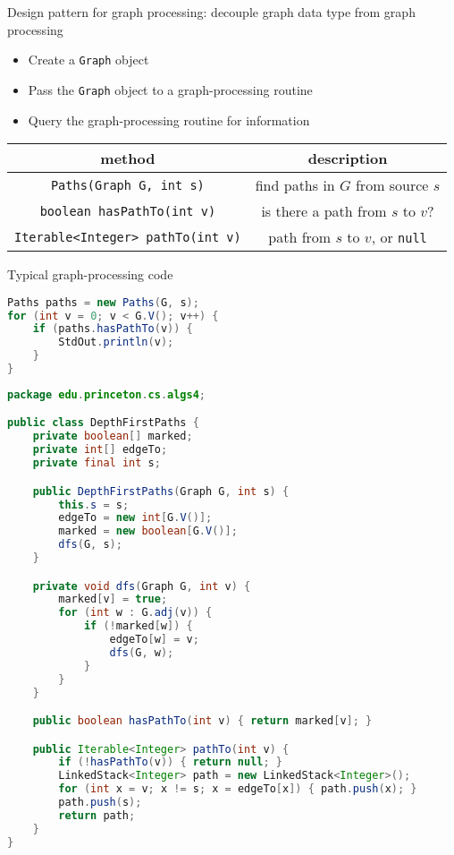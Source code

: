 \documentclass[8pt,a4paper,compress]{beamer}
\begin{document}
\begin{frame}[fragile]
\pause

Design pattern for graph processing: decouple graph data type from graph processing
\begin{itemize}
\item Create a \lstinline{Graph} object
\item Pass the \lstinline{Graph} object to a graph-processing routine
\item Query the graph-processing routine for information
\end{itemize}

\begin{center}
\begin{tabular}{cc}
method & description \\ \hline
\lstinline$Paths(Graph G, int s)$ & find paths in $G$ from source $s$ \\
\lstinline$boolean hasPathTo(int v)$ & is there a path from $s$ to $v$? \\
\lstinline$Iterable<Integer> pathTo(int v)$ & path from $s$ to $v$, or \lstinline$null$
\end{tabular} 
\end{center}

\pause
\bigskip

Typical graph-processing code
\begin{lstlisting}[language=java,style=focusin]
Paths paths = new Paths(G, s);
for (int v = 0; v < G.V(); v++) {
    if (paths.hasPathTo(v)) {
        StdOut.println(v);
    }
}
\end{lstlisting}
\end{frame}

\begin{frame}[fragile]
\pause

\begin{lstlisting}[language=java,style=focusin]
package edu.princeton.cs.algs4;

public class DepthFirstPaths {
    private boolean[] marked; 
    private int[] edgeTo; 
    private final int s; 

    public DepthFirstPaths(Graph G, int s) {
        this.s = s;
        edgeTo = new int[G.V()];
        marked = new boolean[G.V()];
        dfs(G, s);
    }

    private void dfs(Graph G, int v) {
        marked[v] = true;
        for (int w : G.adj(v)) {
            if (!marked[w]) {
                edgeTo[w] = v;
                dfs(G, w);
            }
        }
    }

    public boolean hasPathTo(int v) { return marked[v]; }

    public Iterable<Integer> pathTo(int v) {
        if (!hasPathTo(v)) { return null; }
        LinkedStack<Integer> path = new LinkedStack<Integer>();
        for (int x = v; x != s; x = edgeTo[x]) { path.push(x); }
        path.push(s);
        return path;
    }
}
\end{lstlisting}
\end{frame}
\end{document}
